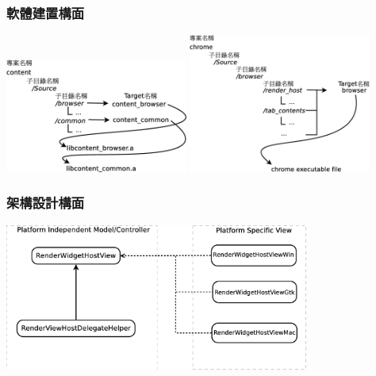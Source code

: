 \documentclass[utf8x]{beamer}
\begin{document}
\begin{frame}
\frametitle{軟體建置構面}
\includegraphics[width=6cm]{deploymentview.eps}
\includegraphics[width=6cm]{deploymentview-chrome.eps}
\end{frame}

\begin{frame}%
\frametitle{架構設計構面}
\begin{center}
\includegraphics[width=10cm]{chromium-mvc.eps}
\end{center}
\end{frame}

\end{document}
